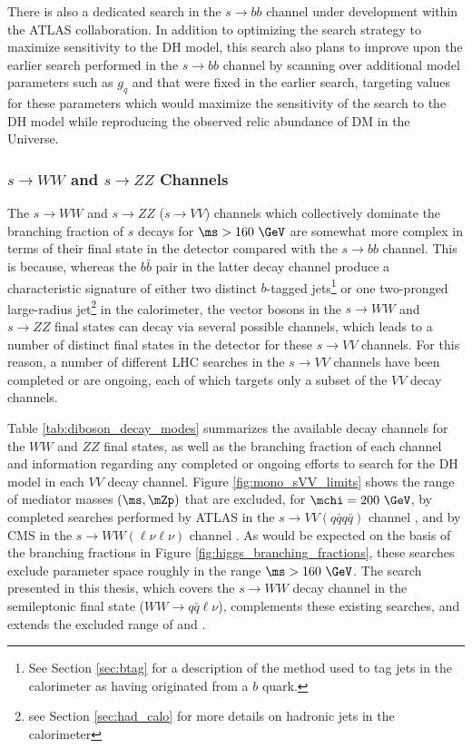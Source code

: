 There is also a dedicated search in the \(s\rightarrow bb\) channel under development within the ATLAS collaboration. In addition to optimizing the search strategy to maximize sensitivity to the DH model, this search also plans to improve upon the earlier search performed in the \(s\rightarrow bb\) channel by scanning over additional model parameters such as \(g_q\) and \mchi that were fixed in the earlier search, targeting values for these parameters which would maximize the sensitivity of the search to the DH model while reproducing the observed relic abundance of DM in the Universe. 

\subsubsection{\(s\rightarrow WW\) and \(s\rightarrow ZZ\) Channels}

The \(s\rightarrow WW\) and \(s\rightarrow ZZ\) (\(s\rightarrow VV\)) channels which collectively dominate the branching fraction of \(s\) decays for \(\ms>160~\GeV\) are somewhat more complex in terms of their final state in the detector compared with the \(s\rightarrow bb\) channel. This is because, whereas the \(b\bar{b}\) pair in the latter decay channel produce a characteristic signature of either two distinct \(b\)-tagged jets\footnote{See Section \ref{sec:btag} for a description of the method used to tag jets in the calorimeter as having originated from a \(b\) quark.} or one two-pronged large-radius jet\footnote{see Section \ref{sec:had_calo} for more details on hadronic jets in the calorimeter} in the calorimeter, the vector bosons in the \(s\rightarrow WW\) and \(s\rightarrow ZZ\) final states can decay via several possible channels, which leads to a number of distinct final states in the detector for these \(s\rightarrow VV\) channels. For this reason, a number of different LHC searches in the \(s\rightarrow VV\) channels have been completed or are ongoing, each of which targets only a subset of the \(VV\) decay channels.  

Table \ref{tab:diboson_decay_modes} summarizes the available decay channels for the \(WW\) and \(ZZ\) final states, as well as the branching fraction of each channel and information regarding any completed or ongoing efforts to search for the DH model in each \(VV\) decay channel. Figure \ref{fig:mono_sVV_limits} shows the range of mediator masses \((\ms, \mZp)\) that are excluded, for \(\mchi=200~\GeV\), by completed searches performed by ATLAS in the \(s\rightarrow VV(q\bar{q}q\bar{q})\) channel \cite{monos_had_paper}, and by CMS in the \(s\rightarrow WW(\ell\nu\ell\nu)\) channel \cite{cms_monos_lep}. As would be expected on the basis of the branching fractions in Figure \ref{fig:higgs_branching_fractions}, these searches exclude parameter space roughly in the range \(\ms > 160~\GeV\). The search presented in this thesis, which covers the \(s\rightarrow WW\) decay channel in the semileptonic final state (\(WW\rightarrow q\bar{q}\ell\nu\)), complements these existing searches, and extends the excluded range of \ms and \mZp. 


